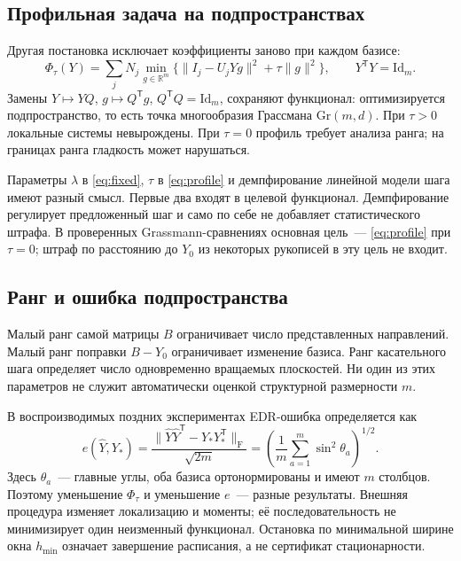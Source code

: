 \documentclass[11pt,a4paper]{article}
\numberwithin{equation}{section}
\newcommand{\R}{\mathbb R}
\newcommand{\Id}{\mathrm{Id}}
\newcommand{\T}{^{\mathsf T}}
\newcommand{\F}{_{\mathrm F}}
\begin{document}
\subsection{Профильная задача на подпространствах}

Другая постановка исключает коэффициенты заново при каждом базисе:
\begin{equation}\label{eq:profile}
 \Phi_\tau(Y)=\sum_jN_j\min_{g\in\R^m}
 \bigl\{\|I_j-U_jYg\|^2+\tau\|g\|^2\bigr\},
 \qquad Y\T Y=\Id_m.
\end{equation}
Замены $Y\mapsto YQ$, $g\mapsto Q\T g$, $Q\T Q=\Id_m$,
сохраняют функционал: оптимизируется подпространство, то есть точка
многообразия Грассмана $\mathrm{Gr}(m,d)$.
При $\tau>0$ локальные системы невырождены. При $\tau=0$
профиль требует анализа ранга; на границах ранга гладкость может нарушаться.

Параметры $\lambda$ в \eqref{eq:fixed}, $\tau$ в \eqref{eq:profile}
и демпфирование линейной модели шага имеют разный смысл.
Первые два входят в целевой функционал. Демпфирование регулирует
предложенный шаг и само по себе не добавляет статистического штрафа.
В проверенных Grassmann-сравнениях основная цель~--- \eqref{eq:profile}
при $\tau=0$; штраф по расстоянию до $Y_0$ из некоторых рукописей
в эту цель не входит.\cite{unified,relative,glmcheck}

\subsection{Ранг и ошибка подпространства}

Малый ранг самой матрицы $B$ ограничивает число представленных
направлений. Малый ранг поправки $B-Y_0$ ограничивает изменение
базиса. Ранг касательного шага определяет число одновременно
вращаемых плоскостей. Ни один из этих параметров не служит автоматически
оценкой структурной размерности $m$.

В воспроизводимых поздних экспериментах EDR-ошибка определяется как
\begin{equation}\label{eq:edr}
 e(\widehat Y,Y_*)=
 \frac{\|\widehat Y\widehat Y\T-Y_*Y_*\T\|\F}{\sqrt{2m}}
 =\left(\frac1m\sum_{a=1}^m\sin^2\theta_a\right)^{1/2}.
\end{equation}
Здесь $\theta_a$~--- главные углы, оба базиса ортонормированы
и имеют $m$ столбцов. Поэтому уменьшение $\Phi_\tau$ и уменьшение
$e$~--- разные результаты. Внешняя процедура изменяет локализацию
и моменты; её последовательность не минимизирует один неизменный
функционал. Остановка по минимальной ширине окна $h_{\min}$
означает завершение расписания, а не сертификат стационарности.
\end{document}
